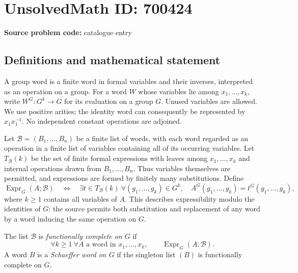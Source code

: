 \documentclass[11pt]{article}
\begin{document}
\section*{UnsolvedMath ID: 700424}
\textbf{Source problem code:} catalogue entry
\subsection{Definitions and mathematical statement}
A group word is a finite word in formal variables and their inverses, interpreted as an operation on a group. For a word \(W\) whose variables lie among \(x_1,\ldots,x_k\), write \(W^G:G^k\to G\) for its evaluation on a group \(G\). Unused variables are allowed. We use positive arities; the identity word can consequently be represented by \(x_1x_1^{-1}\). No independent constant operations are adjoined.

Let \(\mathcal B=(B_1,\ldots,B_n)\) be a finite list of words, with each word regarded as an operation in a finite list of variables containing all of its occurring variables. Let \(T_{\mathcal B}(k)\) be the set of finite formal expressions with leaves among \(x_1,\ldots,x_k\) and internal operations drawn from \(B_1,\ldots,B_n\). Thus variables themselves are permitted, and expressions are formed by finitely many substitutions. Define
\[
\operatorname{Expr}_G(A;\mathcal B)
\quad\Longleftrightarrow\quad
\exists t\in T_{\mathcal B}(k)\ \forall(g_1,\ldots,g_k)\in G^k,\quad
A^G(g_1,\ldots,g_k)=t^G(g_1,\ldots,g_k),
\]
where \(k\geq1\) contains all variables of \(A\). This describes expressibility modulo the identities of \(G\): the source permits both substitution and replacement of any word by a word inducing the same operation on \(G\).

The list \(\mathcal B\) is \emph{functionally complete on \(G\)} if
\[
\forall k\geq1\ \forall A\text{ a word in }x_1,\ldots,x_k,
\qquad \operatorname{Expr}_G(A;\mathcal B).
\]
A word \(B\) is a \emph{Schaeffer word on \(G\)} if the singleton list \((B)\) is functionally complete on \(G\).
\end{document}

